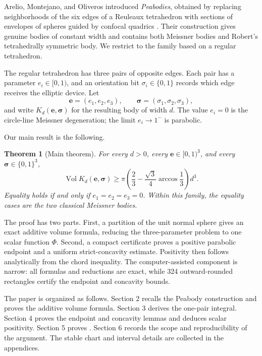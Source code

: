 \documentclass[11pt]{article}
\numberwithin{equation}{section}
\newtheorem{theorem}{Theorem}[section]
\theoremstyle{remark}
\newcommand{\Vol}{\operatorname{Vol}}
\begin{document}
Arelio, Montejano, and Oliveros introduced \emph{Peabodies}, obtained by replacing neighborhoods of the six edges of a Reuleaux tetrahedron with sections of envelopes of spheres guided by confocal quadrics \cite{ArelioMontejanoOliveros2023}. Their construction gives genuine bodies of constant width and contains both Meissner bodies and Robert's tetrahedrally symmetric body. We restrict to the family based on a regular tetrahedron.

The regular tetrahedron has three pairs of opposite edges. Each pair has a parameter \(e_i\in[0,1)\), and an orientation bit \(\sigma_i\in\{0,1\}\) records which edge receives the elliptic device. Let
\[
  \mathbf e=(e_1,e_2,e_3),\qquad
  \boldsymbol\sigma=(\sigma_1,\sigma_2,\sigma_3),
\]
and write \(K_d(\mathbf e,\boldsymbol\sigma)\) for the resulting body of width \(d\). The value \(e_i=0\) is the circle-line Meissner degeneration; the limit \(e_i\to1^-\) is parabolic.

Our main result is the following.

\begin{theorem}[Main theorem]
\label{thm:main}
For every \(d>0\), every \(\mathbf e\in[0,1)^3\), and every \(\boldsymbol\sigma\in\{0,1\}^3\),
\begin{equation}
  \Vol K_d(\mathbf e,\boldsymbol\sigma)
  \ge
  \pi\left(\frac23-\frac{\sqrt3}{4}\arccos\frac13\right)d^3.
  \label{eq:main}
\end{equation}
Equality holds if and only if \(e_1=e_2=e_3=0\). Within this family, the equality cases are the two classical Meissner bodies.
\end{theorem}

The proof has two parts. First, a partition of the unit normal sphere gives an exact additive volume formula, reducing the three-parameter problem to one scalar function \(\Phi\). Second, a compact certificate proves a positive parabolic endpoint and a uniform strict-concavity estimate. Positivity then follows analytically from the chord inequality. The computer-assisted component is narrow: all formulas and reductions are exact, while 324 outward-rounded rectangles certify the endpoint and concavity bounds.

The paper is organized as follows. Section 2 recalls the Peabody construction and proves the additive volume formula. Section 3 derives the one-pair integral. Section 4 proves the endpoint and concavity lemmas and deduces scalar positivity. Section 5 proves . Section 6 records the scope and reproducibility of the argument. The stable chart and interval details are collected in the appendices.
\end{document}
